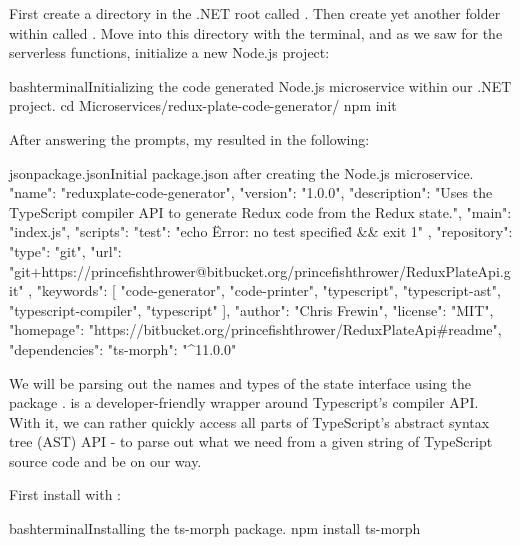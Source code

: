 \documentclass[a4paper,headinclude=on,footinclude=on,12pt,oneside]{scrbook}
\begin{document}

First create a directory in the .NET root called . Then create yet another folder within  called . Move into this directory with the terminal, and as we saw for the serverless functions, initialize a new Node.js project:

\begin{codeInput}{bash}{terminal}{Initializing the code generated Node.js microservice within our .NET project.}
cd Microservices/redux-plate-code-generator/
npm init
\end{codeInput}

After answering the prompts, my  resulted in the following:

\begin{codeInput}{json}{package.json}{Initial package.json after creating the Node.js microservice.}
{
  "name": "reduxplate-code-generator",
  "version": "1.0.0",
  "description": "Uses the TypeScript compiler API to generate Redux code from the Redux state.",
  "main": "index.js",
  "scripts": {
    "test": "echo \"Error: no test specified\" && exit 1"
  },
  "repository": {
    "type": "git",
    "url": "git+https://princefishthrower@bitbucket.org/princefishthrower/ReduxPlateApi.git"
  },
  "keywords": [
    "code-generator",
    "code-printer",
    "typescript",
    "typescript-ast",
    "typescript-compiler",
    "typescript"
  ],
  "author": "Chris Frewin",
  "license": "MIT",
  "homepage": "https://bitbucket.org/princefishthrower/ReduxPlateApi#readme",
  "dependencies": {
    "ts-morph": "^11.0.0"
  }
}  
\end{codeInput}


We will be parsing out the names and types of the state interface using the package .  is a developer-friendly wrapper around Typescript's compiler API. With it, we can rather quickly access all parts of TypeScript's abstract syntax tree (AST) API - to parse out what we need from a given string of TypeScript source code and be on our way.

First install  with :

\begin{codeInput}{bash}{terminal}{Installing the ts-morph package.}
npm install ts-morph
\end{codeInput}
\end{document}
